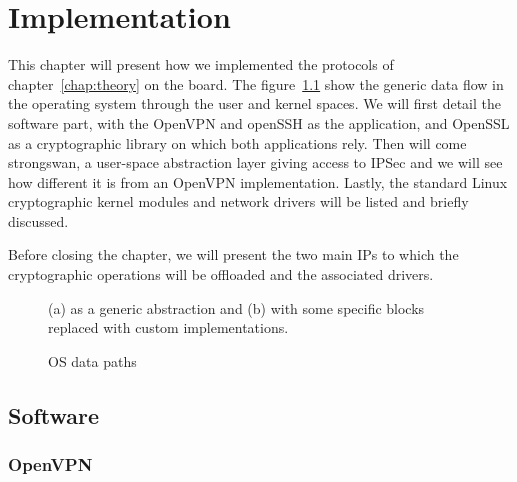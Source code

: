 \chapter{Implementation}
This chapter will present how we implemented the protocols of chapter~\ref{chap:theory} on the board.
The figure~\ref{fig:os-path-generic} show the generic data flow in the operating system through the user and kernel spaces.
We will first detail the software part, with the OpenVPN and openSSH as the application, and OpenSSL as a cryptographic library on which both applications rely.
Then will come strongswan, a user-space abstraction layer giving access to IPSec and we will see how different it is from an OpenVPN implementation.
Lastly, the standard Linux cryptographic kernel modules and network drivers will be listed and briefly discussed.

Before closing the chapter, we will present the two main IPs to which the cryptographic operations will be offloaded and the associated drivers.


\begin{figure}[ht]
\center
{}
\caption{OS data paths}{(a) as a generic abstraction and (b) with some specific blocks replaced with custom implementations.}
\label{fig:os-path-generic}
\end{figure}

\section{Software}

\subsection{OpenVPN}

